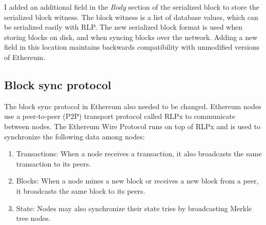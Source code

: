 \documentclass[12pt]{article}
\newcounter{protocol}
\begin{document}
I added an additional field in the \emph{Body} section of the serialized block to store the serialized block witness. The block witness is a list of database values, which can be serialized easily with RLP. The new serialized block format is used when storing blocks on disk, and when syncing blocks over the network. Adding a new field in this location maintains backwards compatibility with unmodified versions of Ethereum.

\subsection{Block sync protocol}

The block sync protocol in Ethereum also needed to be changed. Ethereum nodes use a peer-to-peer (P2P) transport protocol called RLPx to communicate between nodes. The Ethereum Wire Protocol runs on top of RLPx and is used to synchronize the following data among nodes:
\begin{enumerate}
  \item Transactions: When a node receives a transaction, it also broadcasts the same transaction to its peers.
  \item Blocks: When a node mines a new block or receives a new block from a peer, it broadcasts the same block to its peers.
  \item State: Nodes may also synchronize their state tries by broadcasting Merkle tree nodes.
\end{enumerate}
\end{document}
